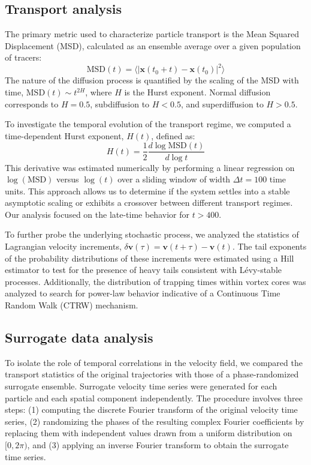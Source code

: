 \documentclass[]{article}
\begin{document}
\subsection{Transport analysis}
The primary metric used to characterize particle transport is the Mean Squared Displacement (MSD), calculated as an ensemble average over a given population of tracers:
\begin{equation}
\text{MSD}(t) = \langle |\mathbf{x}(t_0 + t) - \mathbf{x}(t_0)|^2 \rangle
\end{equation}
The nature of the diffusion process is quantified by the scaling of the MSD with time, $\text{MSD}(t) \sim t^{2H}$, where $H$ is the Hurst exponent. Normal diffusion corresponds to $H=0.5$, subdiffusion to $H<0.5$, and superdiffusion to $H>0.5$.

To investigate the temporal evolution of the transport regime, we computed a time-dependent Hurst exponent, $H(t)$, defined as:
\begin{equation}
H(t) = \frac{1}{2} \frac{d \log \text{MSD}(t)}{d \log t}
\end{equation}
This derivative was estimated numerically by performing a linear regression on $\log(\text{MSD})$ versus $\log(t)$ over a sliding window of width $\Delta t = 100$ time units. This approach allows us to determine if the system settles into a stable asymptotic scaling or exhibits a crossover between different transport regimes. Our analysis focused on the late-time behavior for $t > 400$.

To further probe the underlying stochastic process, we analyzed the statistics of Lagrangian velocity increments, $\delta \mathbf{v}(\tau) = \mathbf{v}(t+\tau) - \mathbf{v}(t)$. The tail exponents of the probability distributions of these increments were estimated using a Hill estimator to test for the presence of heavy tails consistent with L\'evy-stable processes. Additionally, the distribution of trapping times within vortex cores was analyzed to search for power-law behavior indicative of a Continuous Time Random Walk (CTRW) mechanism.

\subsection{Surrogate data analysis}
To isolate the role of temporal correlations in the velocity field, we compared the transport statistics of the original trajectories with those of a phase-randomized surrogate ensemble. Surrogate velocity time series were generated for each particle and each spatial component independently. The procedure involves three steps: (1) computing the discrete Fourier transform of the original velocity time series, (2) randomizing the phases of the resulting complex Fourier coefficients by replacing them with independent values drawn from a uniform distribution on $[0, 2\pi)$, and (3) applying an inverse Fourier transform to obtain the surrogate time series.
\end{document}
